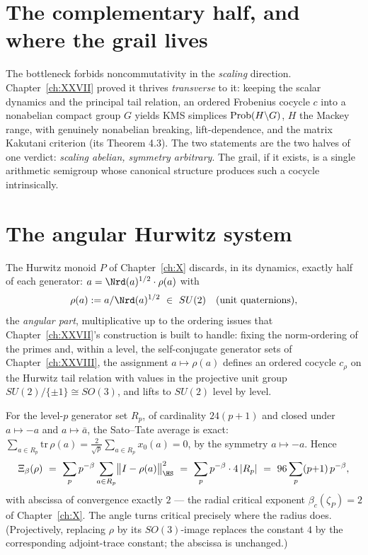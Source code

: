 \section{The complementary half, and where the grail lives}\label{XXXIV:sec:complement}

The bottleneck forbids noncommutativity in the \emph{scaling} direction. Chapter~\ref{ch:XXVII}
proved it thrives \emph{transverse} to it: keeping the scalar dynamics and the principal
tail relation, an ordered Frobenius cocycle $c$ into a nonabelian compact group $G$
yields KMS simplices $\mathrm{Prob}(H\backslash G)$, $H$ the Mackey range, with genuinely
nonabelian breaking, lift-dependence, and the matrix Kakutani criterion (its Theorem
4.3). The two statements are the two halves of one verdict: \emph{scaling abelian,
symmetry arbitrary}. The grail, if it exists, is a single arithmetic semigroup whose
canonical structure produces such a cocycle intrinsically.

\section{The angular Hurwitz system}\label{XXXIV:sec:angular}

The Hurwitz monoid $P$ of Chapter~\ref{ch:X} discards, in its dynamics, exactly half of each
generator: $a=\Nrd(a)^{1/2}\cdot\rho(a)$ with
\[
\rho(a):=a/\Nrd(a)^{1/2}\ \in\ SU(2)\quad(\text{unit quaternions}),
\]
the \emph{angular part}, multiplicative up to the ordering issues that Chapter~\ref{ch:XXVII}'s
construction is built to handle: fixing the norm-ordering of the primes and, within a
level, the self-conjugate generator sets of Chapter~\ref{ch:XXVIII}, the assignment
$a\mapsto\rho(a)$ defines an ordered cocycle $c_\rho$ on the Hurwitz tail relation with
values in the projective unit group $SU(2)/\{\pm1\}\cong SO(3)$, and lifts to $SU(2)$
level by level.

\begin{proposition}\label{XXXIV:prop:angular}
For the level-$p$ generator set $R_p$, of cardinality $24(p{+}1)$ and closed under
$a\mapsto-a$ and $a\mapsto\bar a$, the Sato--Tate average is exact:
$\sum_{a\in R_p}\mathrm{tr}\,\rho(a)=\frac{2}{\sqrt p}\sum_{a\in R_p}x_0(a)=0$, by the
symmetry $a\mapsto-a$. Hence
\[
\Xi_\beta(\rho)\ =\ \sum_p p^{-\beta}\sum_{a\in R_p}\bigl\|I-\rho(a)\bigr\|_{\HS}^2
\ =\ \sum_p p^{-\beta}\cdot 4\,|R_p|
\ =\ 96\sum_p(p{+}1)\,p^{-\beta},
\]
with abscissa of convergence exactly $2$ --- the radial critical exponent
$\beta_c(\zeta_P)=2$ of Chapter~\ref{ch:X}. The angle turns critical precisely where the radius
does. (Projectively, replacing $\rho$ by its $SO(3)$-image replaces the constant $4$ by
the corresponding adjoint-trace constant; the abscissa is unchanged.)
\end{proposition}


